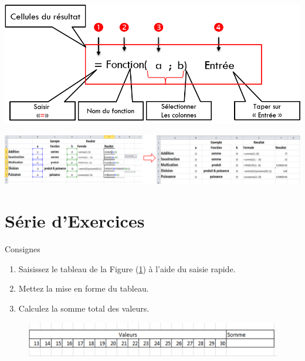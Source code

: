 \begin{center}  
	\includegraphics[scale=0.2,width= \linewidth]{img/arithmetique3} 
\end{center}

\begin{Exemple}
\end{Exemple}
\begin{center}  
	\includegraphics[scale=0.2,width= \linewidth]{img/fonctions3} 
\end{center}

\section{Série d'Exercices}

\begin{exercice}\label{ex8}
	Consignes 
	\begin{enumerate}		
		\item  Saisissez le tableau  de la Figure (\ref{exo8}) à l'aide du saisie rapide.  				
		\item  Mettez la mise en forme  du tableau.
		\item  Calculez la somme total des valeurs.
	\end{enumerate}	
\end{exercice}
\begin{figure}[H]
	\centering
	\includegraphics[scale=0.2,width= \linewidth]{img/ex08}
	 \label{exo8}
\end{figure}

